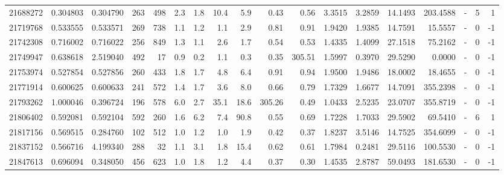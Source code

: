 \begin{tabular}{rrrrrrrrrrrrrrrlrr}
  21688272 & 0.304803 &   0.304790 &  263 &  498 &      2.3 &      1.8 &    10.4 &      5.9 &       0.43 &        0.56 &  3.3515 &  3.2859 &   14.1493 &  203.4588 &             - &        5 &          1 \\
  21719768 & 0.533555 &   0.533571 &  269 &  738 &      1.1 &      1.2 &     1.1 &      2.9 &       0.81 &        0.91 &  1.9420 &  1.9385 &   14.7591 &   15.5557 &             - &        0 &         -1 \\
  21742308 & 0.716002 &   0.716022 &  256 &  849 &      1.3 &      1.1 &     2.6 &      1.7 &       0.54 &        0.53 &  1.4335 &  1.4099 &   27.1518 &   75.2162 &             - &        0 &         -1 \\
  21749947 & 0.638618 &   2.519040 &  492 &   17 &      0.9 &      0.2 &     1.1 &      0.3 &       0.35 &      305.51 &  1.5997 &  0.3970 &   29.5290 &    0.0000 &             - &        0 &         -1 \\
  21753974 & 0.527854 &   0.527856 &  260 &  433 &      1.8 &      1.7 &     4.8 &      6.4 &       0.91 &        0.94 &  1.9500 &  1.9486 &   18.0002 &   18.4655 &             - &        0 &         -1 \\
  21771914 & 0.600625 &   0.600633 &  241 &  572 &      1.4 &      1.7 &     3.6 &      8.0 &       0.66 &        0.79 &  1.7329 &  1.6677 &   14.7091 &  355.2398 &             - &        0 &         -1 \\
  21793262 & 1.000046 &   0.396724 &  196 &  578 &      6.0 &      2.7 &    35.1 &     18.6 &     305.26 &        0.49 &  1.0433 &  2.5235 &   23.0707 &  355.8719 &             - &        0 &         -1 \\
  21806402 & 0.592081 &   0.592104 &  592 &  260 &      1.6 &      6.2 &     7.4 &     90.8 &       0.55 &        0.69 &  1.7228 &  1.7033 &   29.5902 &   69.5410 &             - &        6 &          1 \\
  21817156 & 0.569515 &   0.284760 &  102 &  512 &      1.0 &      1.2 &     1.0 &      1.9 &       0.42 &        0.37 &  1.8237 &  3.5146 &   14.7525 &  354.6099 &             - &        0 &         -1 \\
  21837152 & 0.566716 &   4.199340 &  288 &   32 &      1.1 &      3.1 &     1.8 &     15.4 &       0.62 &        0.61 &  1.7984 &  0.2481 &   29.5116 &  100.5530 &             - &        0 &         -1 \\
  21847613 & 0.696094 &   0.348050 &  456 &  623 &      1.0 &      1.8 &     1.2 &      4.4 &       0.37 &        0.30 &  1.4535 &  2.8787 &   59.0493 &  181.6530 &             - &        0 &         -1 \\

\end{tabular}
